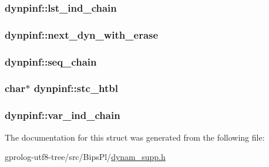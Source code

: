 \subsubsection[{\texorpdfstring{lst\+\_\+ind\+\_\+chain}{lst_ind_chain}}]{ dynpinf\+::lst\+\_\+ind\+\_\+chain}\hypertarget{structdynpinf_a1c4ab87dddfafc7e912446a2cc391e3f}{}\label{structdynpinf_a1c4ab87dddfafc7e912446a2cc391e3f}
\subsubsection[{\texorpdfstring{next\+\_\+dyn\+\_\+with\+\_\+erase}{next_dyn_with_erase}}]{ dynpinf\+::next\+\_\+dyn\+\_\+with\+\_\+erase}\hypertarget{structdynpinf_a5845421aa8bf227923c6ed1073c32b17}{}\label{structdynpinf_a5845421aa8bf227923c6ed1073c32b17}
\subsubsection[{\texorpdfstring{seq\+\_\+chain}{seq_chain}}]{ dynpinf\+::seq\+\_\+chain}\hypertarget{structdynpinf_a7fd9dcc867aa4461a78fd7ea113fe30e}{}\label{structdynpinf_a7fd9dcc867aa4461a78fd7ea113fe30e}
\subsubsection[{\texorpdfstring{stc\+\_\+htbl}{stc_htbl}}]{\setlength{\rightskip}{0pt plus 5cm}char$\ast$ dynpinf\+::stc\+\_\+htbl}\hypertarget{structdynpinf_a34e514b87f630efa4c7d2936979e7735}{}\label{structdynpinf_a34e514b87f630efa4c7d2936979e7735}
\subsubsection[{\texorpdfstring{var\+\_\+ind\+\_\+chain}{var_ind_chain}}]{ dynpinf\+::var\+\_\+ind\+\_\+chain}\hypertarget{structdynpinf_a81ff1365c770d4e9e503ec13d0829c89}{}\label{structdynpinf_a81ff1365c770d4e9e503ec13d0829c89}


The documentation for this struct was generated from the following file\+:\begin{DoxyCompactItemize}
\item 
gprolog-\/utf8-\/tree/src/\+Bips\+Pl/\hyperlink{dynam__supp_8h}{dynam\+\_\+supp.\+h}\end{DoxyCompactItemize}
